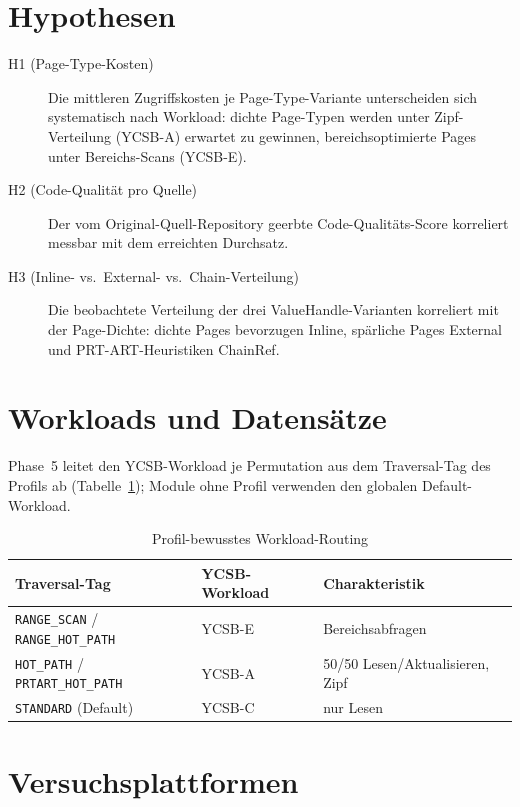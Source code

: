 \section{Hypothesen}\label{sec:hypotheses}

\begin{description}
  \item[H1 (Page-Type-Kosten)] Die mittleren Zugriffskosten je Page-Type-Variante
        unterscheiden sich systematisch nach Workload: dichte Page-Typen werden unter
        Zipf-Verteilung (YCSB-A) erwartet zu gewinnen, bereichsoptimierte Pages unter
        Bereichs-Scans (YCSB-E).
  \item[H2 (Code-Qualität pro Quelle)] Der vom Original-Quell-Repository geerbte
        Code-Qualitäts-Score korreliert messbar mit dem erreichten Durchsatz.
  \item[H3 (Inline- vs.\ External- vs.\ Chain-Verteilung)] Die beobachtete Verteilung der drei
        ValueHandle-Varianten korreliert mit der Page-Dichte: dichte Pages bevorzugen Inline,
        spärliche Pages External und PRT-ART-Heuristiken ChainRef.
\end{description}

\section{Workloads und Datensätze}\label{sec:workloads}

Phase~5 leitet den YCSB-Workload je Permutation aus dem Traversal-Tag des Profils ab
(Tabelle~\ref{tab:workload-routing}); Module ohne Profil verwenden den globalen
Default-Workload.

\begin{table}[h]
\centering
\caption{Profil-bewusstes Workload-Routing}\label{tab:workload-routing}
\begin{tabular}{lll}
\toprule
\textbf{Traversal-Tag} & \textbf{YCSB-Workload} & \textbf{Charakteristik} \\
\midrule
\texttt{RANGE\_SCAN} / \texttt{RANGE\_HOT\_PATH} & YCSB-E & Bereichsabfragen \\
\texttt{HOT\_PATH} / \texttt{PRTART\_HOT\_PATH} & YCSB-A & 50/50 Lesen/Aktualisieren, Zipf \\
\texttt{STANDARD} (Default) & YCSB-C & nur Lesen \\
\bottomrule
\end{tabular}
\end{table}

\section{Versuchsplattformen}\label{sec:platforms}

